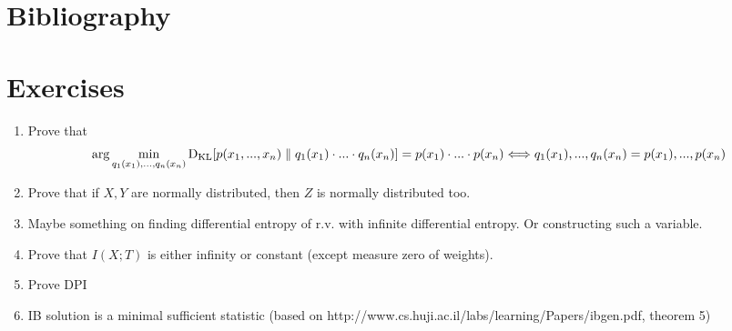 \documentclass{article}
\begin{document}
\section{Bibliography}
\printbibliography

\section*{Exercises}
\begin{enumerate}
    \item Prove that
\[
\arg \min_{q_1(x_1) , ... , q_n(x_n)} \text{D}_\text{KL}[p(x_1, ..., x_n) \parallel q_1(x_1) \cdot ... \cdot q_n(x_n)] = p(x_1) \cdot ... \cdot p(x_n) \Longleftrightarrow q_1(x_1) , ... , q_n(x_n) = p(x_1), ..., p(x_n)
\]
    \item Prove that if $X, Y$ are normally distributed, then $Z$ is normally distributed too. %
    \item Maybe something on finding differential entropy of r.v. with infinite differential entropy. Or constructing such a variable.
    \item Prove that $I(X;T)$ is either infinity or constant (except measure zero of weights).
    \item Prove DPI
    \item IB solution is a minimal sufficient statistic (based on http://www.cs.huji.ac.il/labs/learning/Papers/ibgen.pdf, theorem 5)
\end{enumerate}
\end{document}
